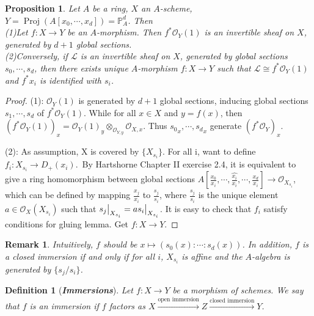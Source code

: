 \documentclass{ctexart}
\newtheorem{definition}{Definition}[section]
\newtheorem{remark}{Remark}[section]
\newtheorem{proposition}{Proposition}[section]
\newcommand{\proj}{\operatorname{Proj}}
\begin{document}
\begin{proposition}
    Let $A$ be a ring, $X$ an $A$-scheme, $Y = \proj (A[x_{0}, \cdots, x_{d}]) = \mathbb{P}_{A}^{d}$.
    Then \\
    (1)Let $f: X \longrightarrow Y$ be an $A$-morphism.
    Then $f^{\ast}\mathcal{O}_{Y}(1)$ is an invertible sheaf on $X$, generated by $d + 1$ global sections. \\
    (2)Conversely, if $\mathcal{L}$ is an invertible sheaf on $X$, generated by global sections $s_{0}, \cdots, s_{d}$,
    then there exists unique $A$-morphism $f: X \longrightarrow Y$ such that $\mathcal{L} \cong f^{\ast}\mathcal{O}_{Y}(1)$ and $f^{\ast}x_{i}$ is identified with $s_{i}$.
    \label{Proposition 4.1}
\end{proposition}
\begin{proof}
    (1): $\mathcal{O}_{Y}(1)$ is generated by $d + 1$ global sections, inducing global sections $s_{1}, \cdots, s_{d}$ of $f^{\ast}\mathcal{O}_{Y}(1)$.
    While for all $x\in X$ and $y = f(x)$, then $(f^{\ast}\mathcal{O}_{Y}(1))_{x} = \mathcal{O}_{Y}(1)_{y} \otimes_{\mathcal{O}_{Y, y}} \mathcal{O}_{X, x}$.
    Thus ${s_{0}}_{x}, \cdots, {s_{d}}_{x}$ generate $(f^{\ast}\mathcal{O}_{Y})_{x}$.
    \par
    (2): As assumption, X is covered by $\{X_{s_{i}}\}$.
    For all i, want to define $f_{i}: X_{s_{i}} \longrightarrow D_{+}(x_{i})$.\
    By Hartshorne Chapter II exercise 2.4, it is equivalent to give a ring homomorphism between global sections $A[\frac{x_{0}}{x_{i}}, \cdots, \widehat{\frac{x_{i}}{x_{i}}}, \cdots, \frac{x_{d}}{x_{i}}] \longrightarrow \mathcal{O}_{X_{s_{i}}}$,
    which can be defined by mapping $\frac{x_{j}}{x_{i}}$ to $\frac{s_{j}}{s_{i}}$,
    where $\frac{s_{j}}{s_{i}}$ is the unique element $a\in \mathcal{O}_{X}(X_{s_{i}})$ such that $s_{j}\big{|}_{X_{s_{i}}} = as_{i}\big{|}_{X_{s_{i}}}$.
    It is easy to check that $f_{i}$ satisfy conditions for gluing lemma.
    Get $f: X \longrightarrow Y$.
\end{proof}
\begin{remark}
    Intuitively, $f$ should be $x \longmapsto (s_{0}(x) : \cdots : s_{d}(x))$.
    In addition, $f$ is a closed immersion if and only if for all $i$, $X_{s_{i}}$ is affine and the $A$-algebra is generated by $\{s_{j}/s_{i}\}$.
\end{remark}
\begin{definition}[\textbf{\emph{Immersions}}]
    Let $f: X \longrightarrow Y$ be a morphism of schemes.
    We say that $f$ is an immersion if $f$ factors as $X \overset{\text{open immersion}}{\longrightarrow} Z \overset{\text{closed immersion}}{\longrightarrow} Y$.
\end{definition}
\end{document}
